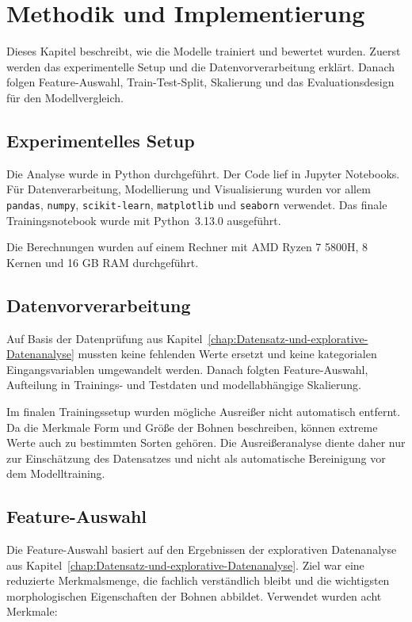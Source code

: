 \chapter{Methodik und Implementierung}\label{chap:Methodik-und--Implementierung}
Dieses Kapitel beschreibt, wie die Modelle trainiert und bewertet wurden. Zuerst werden das experimentelle Setup und die Datenvorverarbeitung erklärt. Danach folgen Feature-Auswahl, Train-Test-Split, Skalierung und das Evaluationsdesign für den Modellvergleich.



\section{Experimentelles Setup}

Die Analyse wurde in Python durchgeführt. Der Code lief in Jupyter Notebooks. Für Datenverarbeitung, Modellierung und Visualisierung wurden vor allem \texttt{pandas}, \texttt{numpy}, \texttt{scikit-learn}, \texttt{matplotlib} und \texttt{seaborn} verwendet. Das finale Trainingsnotebook wurde mit Python~3.13.0 ausgeführt.

Die Berechnungen wurden auf einem Rechner mit AMD Ryzen 7 5800H, 8 Kernen und 16 GB RAM durchgeführt.

\section{Datenvorverarbeitung}

Auf Basis der Datenprüfung aus Kapitel~\ref{chap:Datensatz-und-explorative-Datenanalyse} mussten keine fehlenden Werte ersetzt und keine kategorialen Eingangsvariablen umgewandelt werden. Danach folgten Feature-Auswahl, Aufteilung in Trainings- und Testdaten und modellabhängige Skalierung.

Im finalen Trainingssetup wurden mögliche Ausreißer nicht automatisch entfernt. Da die Merkmale Form und Größe der Bohnen beschreiben, können extreme Werte auch zu bestimmten Sorten gehören. Die Ausreißeranalyse diente daher nur zur Einschätzung des Datensatzes und nicht als automatische Bereinigung vor dem Modelltraining.


\section{Feature-Auswahl}

Die Feature-Auswahl basiert auf den Ergebnissen der explorativen Datenanalyse aus Kapitel~\ref{chap:Datensatz-und-explorative-Datenanalyse}. Ziel war eine reduzierte Merkmalsmenge, die fachlich verständlich bleibt und die wichtigsten morphologischen Eigenschaften der Bohnen abbildet. Verwendet wurden acht Merkmale:

